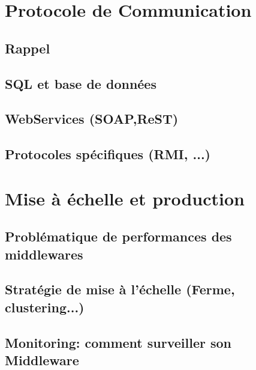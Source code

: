 \newpage

\section{Protocole de Communication}
\subsection{Rappel}

\subsection{SQL et base de données}

\subsection{WebServices (SOAP,ReST)}

\subsection{Protocoles spécifiques (RMI, ...) }

\section{Mise à échelle et production}

\subsection{Problématique de performances des middlewares}

\subsection{Stratégie de mise à l'échelle (Ferme, clustering...)}

\subsection{Monitoring: comment surveiller son Middleware}
